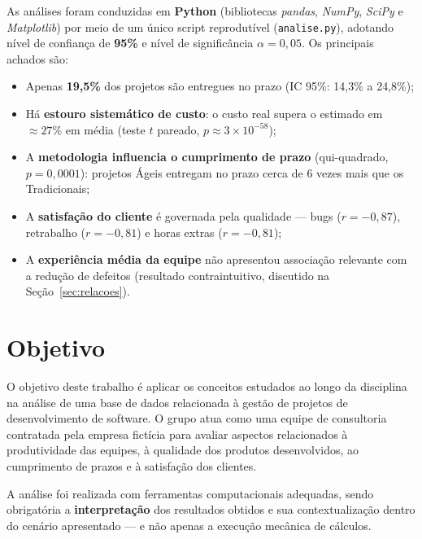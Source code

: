 \documentclass[a4paper, 12pt]{article}
\newcommand{\var}[1]{\texttt{#1}}
\begin{document}
As análises foram conduzidas em \textbf{Python} (bibliotecas \emph{pandas},
\emph{NumPy}, \emph{SciPy} e \emph{Matplotlib}) por meio de um único script
reprodutível (\var{analise.py}), adotando nível de confiança de \textbf{95\%}
e nível de significância $\alpha = 0{,}05$. Os principais achados são:

\begin{itemize}[noitemsep]
	\item Apenas \textbf{19,5\%} dos projetos são entregues no prazo
	      (IC 95\%: 14,3\% a 24,8\%);
	\item Há \textbf{estouro sistemático de custo}: o custo real supera o
	      estimado em $\approx 27\%$ em média (teste $t$ pareado, $p \approx 3\times10^{-58}$);
	\item A \textbf{metodologia influencia o cumprimento de prazo}
	      (qui-quadrado, $p = 0{,}0001$): projetos Ágeis entregam no prazo cerca
	      de 6 vezes mais que os Tradicionais;
	\item A \textbf{satisfação do cliente} é governada pela qualidade ---
	      bugs ($r=-0{,}87$), retrabalho ($r=-0{,}81$) e horas extras
	      ($r=-0{,}81$);
	\item A \textbf{experiência média da equipe} não apresentou associação
	      relevante com a redução de defeitos (resultado contraintuitivo,
	      discutido na Seção~\ref{sec:relacoes}).
\end{itemize}

\section{Objetivo}

O objetivo deste trabalho é aplicar os conceitos estudados ao longo da disciplina
na análise de uma base de dados relacionada à gestão de projetos de
desenvolvimento de software. O grupo atua como uma equipe de consultoria
contratada pela empresa fictícia para avaliar aspectos relacionados à
produtividade das equipes, à qualidade dos produtos desenvolvidos, ao
cumprimento de prazos e à satisfação dos clientes.

A análise foi realizada com ferramentas computacionais adequadas, sendo
obrigatória a \textbf{interpretação} dos resultados obtidos e sua
contextualização dentro do cenário apresentado --- e não apenas a execução
mecânica de cálculos.
\end{document}
